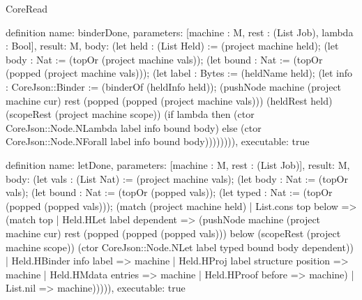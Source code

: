 \begin{lexlean}{CoreRead}
\begin{semanticmodule}
definition{
  name: binderDone,
  parameters: [machine : M, rest : (List Job), lambda : Bool],
  result: M,
  body: (let held : (List Held) := (project machine held); (let body : Nat := (topOr (project machine vals)); (let bound : Nat := (topOr (popped (project machine vals))); (let label : Bytes := (heldName held); (let info : CoreJson::Binder := (binderOf (heldInfo held)); (pushNode machine (project machine cur) rest (popped (popped (project machine vals))) (heldRest held) (scopeRest (project machine scope)) (if lambda then (ctor CoreJson::Node.NLambda label info bound body) else (ctor CoreJson::Node.NForall label info bound body)))))))),
  executable: true
}

definition{
  name: letDone,
  parameters: [machine : M, rest : (List Job)],
  result: M,
  body: (let vals : (List Nat) := (project machine vals); (let body : Nat := (topOr vals); (let bound : Nat := (topOr (popped vals)); (let typed : Nat := (topOr (popped (popped vals))); (match (project machine held)
    | List.cons top below => (match top
      | Held.HLet label dependent => (pushNode machine (project machine cur) rest (popped (popped (popped vals))) below (scopeRest (project machine scope)) (ctor CoreJson::Node.NLet label typed bound body dependent))
      | Held.HBinder info label => machine
      | Held.HProj label structure position => machine
      | Held.HMdata entries => machine
      | Held.HProof before => machine)
    | List.nil => machine))))),
  executable: true
}


\end{semanticmodule}
\end{lexlean}
